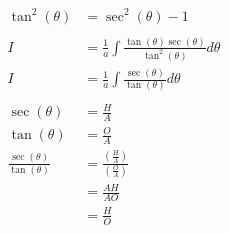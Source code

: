 \documentclass[12pt]{article}
\begin{document}
\begin{align}
    \tan^2(\theta)                                         & = \sec^2(\theta) - 1                                                                                                                                          \\
    \nonumber                                                                                                                                                                                                              \\
    I                                                      & = \frac{1}{a} \int \frac{\tan(\theta)\sec(\theta)}{\tan^2(\theta)}  d\theta                                                                                   \\
    I                                                      & = \frac{1}{a} \int \frac{\sec(\theta)}{\tan(\theta)}  d\theta                                                                                                 \\
    \nonumber                                                                                                                                                                                                              \\
    \sec(\theta)                                           & = \frac{H}{A}                                                                                                                                                 \\
    \tan(\theta)                                           & = \frac{O}{A}                                                                                                                                                 \\
    \frac{\sec(\theta)}{\tan(\theta)}                      & = \frac{\left(\frac{H}{A}\right)}{\left(\frac{O}{A}\right)}                                                                                                   \\
                                                           & = \frac{AH}{AO}                                                                                                                                               \\
                                                           & = \frac{H}{O}                                                                                                                                                 \\

\end{align}
\end{document}
